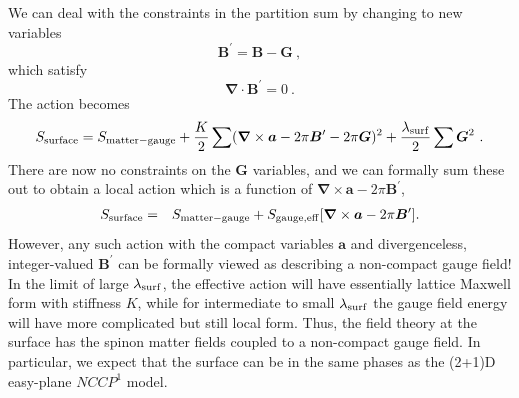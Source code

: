 We can deal with the constraints in the partition sum by changing to new variables
\begin{equation}
{\bm B}^\prime = {\bm B} - {\bm G} ~,
\end{equation}
which satisfy
\begin{equation}
{\bm \nabla} \cdot {\bm B}^\prime = 0 ~.
\end{equation}
The action becomes 
\begin{eqnarray*}
S_{\rm surface} = S_{\rm matter-gauge} + \frac{K}{2}\sum  ({\bm\nabla} \times {\bm a}  - 2\pi {\bm B}^\prime - 2\pi {\bm G})^2 
 + \frac{\lambda_{\rm surf}}{2}\sum  {\bm G}^2 ~.
\end{eqnarray*}
There are now no constraints on the ${\bm G}$ variables, and we can formally sum these out to obtain a local action which is a function of ${\bm\nabla} \times {\bm a} - 2\pi {\bm B}^\prime$,
\begin{eqnarray}
S_{\rm surface} &=& S_{\rm matter-gauge} + S_{\rm gauge, eff}[{\bm\nabla} \times {\bm a}  - 2\pi {\bm B}^\prime] .
\label{partsurface}
\end{eqnarray}
However, any such action with the compact variables ${\bm a}$ and divergenceless, integer-valued ${\bm B}^\prime$ can be formally viewed as describing a non-compact gauge field!  In the limit of large $\lambda_{\rm surf}$, the effective action will have essentially lattice Maxwell form with stiffness $K$, while for intermediate to small $\lambda_{\rm surf}$ the gauge field energy will have more complicated but still local form.  Thus, the field theory at the surface has the spinon matter fields coupled to a non-compact gauge field.  In particular, we expect that the surface can be in the same phases as the (2+1)D easy-plane $NCCP^1$ model.

